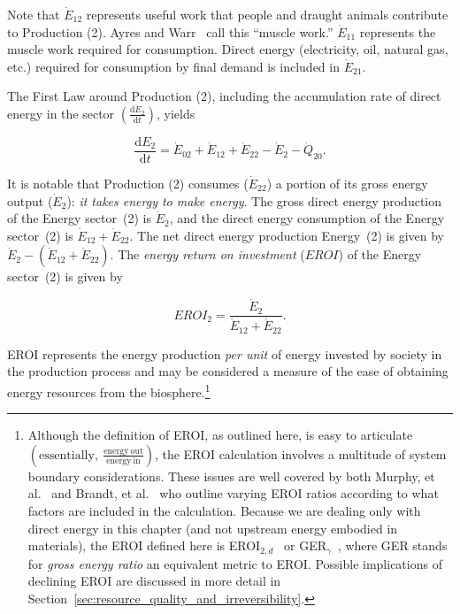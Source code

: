 Note that $\dot{E}_{12}$ represents useful work that people
and draught animals contribute to Production (2). 
Ayres and Warr~\cite{Ayres:2003ec,Warr:2012cg} call this ``muscle work.'' 
$\dot{E}_{11}$ represents the muscle work required for consumption. 
Direct energy (electricity, oil, natural gas, etc.) 
required for consumption by final demand 
is included in $\dot{E}_{21}$.

The First Law around Production (2), 
including the accumulation rate of direct energy in the sector 
$\left(\frac{\mathrm{d}E_{2}}{\mathrm{d}t}\right)$, yields

\begin{equation} \label{eq:CV_E_dot_2}
	\frac{\mathrm{d}E_{2}}{\mathrm{d}t} 
	= \dot{E}_{02} 
	+ \dot{E}_{12}
	+ \dot{E}_{22} 
	- \dot{E}_{2} 
	- \dot{Q}_{20}.
\end{equation}

\noindent It is notable that Production (2) consumes ($\dot{E}_{22}$)
a portion of its gross energy output ($\dot{E}_2$): \emph{it takes energy to make energy}.
The gross direct energy production of the Energy sector~(2) is 
$\dot{E}_{2}$, and the direct energy consumption of the Energy sector~(2) is 
$\dot{E}_{12} + \dot{E}_{22}$. 
The net direct energy production Energy~(2)
is given by $\dot{E}_{2} - (\dot{E}_{12} + \dot{E}_{22})$.
The \emph{energy return on investment}
($EROI$) of the Energy sector~(2) is given by

\begin{equation} \label{eq:C-EROI}
	EROI_{2} 
	= \frac{\dot{E}_{2}}{\dot{E}_{12} + \dot{E}_{22}}.
\end{equation}

\noindent{}EROI represents the energy production \emph{per unit} of energy
invested by society in the production process and may
be considered a measure of the ease of obtaining
energy resources from the biosphere.\footnote{Although
	the definition of EROI, as outlined here, 
	is easy to articulate 
	$\left( \mathrm{essentially,} \: \frac{\mathrm{energy~out}}{\mathrm{energy~in}} \right)$,
	the EROI
	calculation involves a multitude of system boundary
	considerations.
	These issues are well covered by both Murphy, et al.~\cite{Murphy2011}
	and Brandt, et al.~\cite{Brandt2011a, Brandt2013} who outline varying
	EROI
	ratios according to what factors are included in the calculation.
	Because we are dealing only with direct energy in this chapter
	(and not upstream energy embodied in materials),
	the EROI
	defined here is EROI$_{2,d}$~\cite[Table~1]{Murphy2011}
	or GER$_{\gamma}$~\cite[Table~1]{Brandt2011},
	where GER stands for \emph{gross energy ratio}
	an equivalent metric to EROI\@.
	Possible implications of declining EROI
	are discussed in more
	detail in Section~\ref{sec:resource_quality_and_irreversibility}.
}

